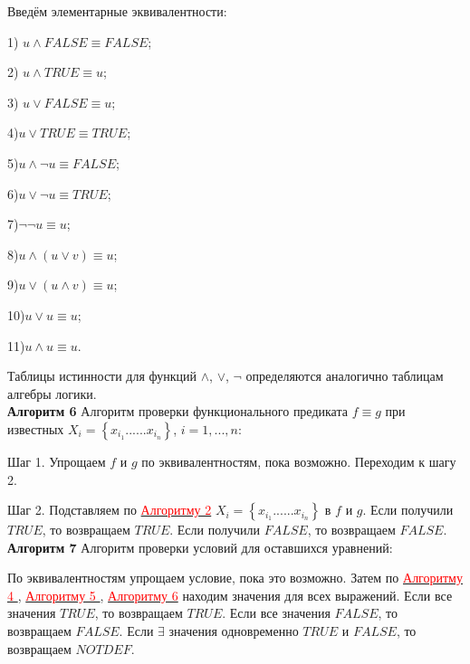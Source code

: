 \documentclass[12pt]{article}
\begin{document}
     Введём элементарные эквивалентности:
     
     1) $u\wedge FALSE\equiv FALSE$;
     
     2) $u\wedge TRUE\equiv u$;
     
     3) $u\vee FALSE\equiv u$;
     
     4)$u\vee TRUE\equiv TRUE$;
     
     5)$u \wedge \neg u \equiv FALSE$;
     
     6)$u \vee \neg u \equiv TRUE$;
     
     7)$\neg \neg u \equiv u$;
     
     8)$u\wedge (u \vee v)\equiv u$;
     
     9)$u\vee (u \wedge v)\equiv u$;
     
     10)$u \vee u \equiv u$;
     
     11)$u \wedge u \equiv u$.
     
     Таблицы истинности для функций $\wedge$, $\vee$, $\neg$ определяются аналогично таблицам алгебры логики.
     \\
     
      \hypertarget{a6}{{\bf Алгоритм 6}} Алгоритм проверки функционального предиката $f \equiv g $ при известных $ X_{i} = \left\lbrace x_{i_{1}} ......x_{i_{n}}\right\rbrace $, $i = 1,...,n$:
      
      Шаг 1. Упрощаем $f$ и $g$ по эквивалентностям, пока возможно. Переходим к шагу 2.
      
      Шаг 2. Подставляем по \hyperlink{a2}{ \textcolor{red}{Алгоритму 2}} $ X_{i} = \left\lbrace x_{i_{1}} ......x_{i_{n}}\right\rbrace $ в $f$ и $g$. Если получили $TRUE$, то возвращаем  $TRUE$.  Если получили $FALSE$, то возвращаем  $FALSE$.
     \\
     
    
      
      \hypertarget{a7}{{\bf Алгоритм 7}} Алгоритм проверки условий для оставшихся уравнений:
     
       
       По эквивалентностям упрощаем условие, пока это возможно. Затем по   \hyperlink{a4}{ \textcolor{red}{Алгоритму 4 }},  \hyperlink{a5}{ \textcolor{red}{Алгоритму 5 }},  \hyperlink{a6}{ \textcolor{red}{Алгоритму 6}} находим значения для всех выражений. Если все значения $TRUE$, то возвращаем $TRUE$. Если все значения $FALSE$, то возвращаем $FALSE$. Если $\exists$ значения одновременно $TRUE$ и $FALSE$, то возвращаем $NOTDEF$.
      \\
      
\end{document}
